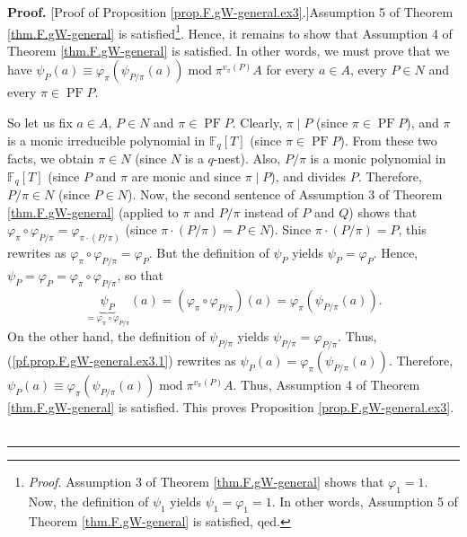 \documentclass[numbers=enddot,12pt,final,onecolumn,notitlepage]{scrartcl}%
\theoremstyle{definition}
\newenvironment{proof}[1][Proof]{\noindent\textbf{#1.} }{\ \rule{0.5em}{0.5em}}
\begin{document}
\begin{proof}
[Proof of Proposition \ref{prop.F.gW-general.ex3}.]Assumption 5 of Theorem
\ref{thm.F.gW-general} is satisfied\footnote{\textit{Proof.} Assumption 3 of
Theorem \ref{thm.F.gW-general} shows that $\varphi_{1}=1$. Now, the definition
of $\psi_{1}$ yields $\psi_{1}=\varphi_{1}=1$. In other words, Assumption 5 of
Theorem \ref{thm.F.gW-general} is satisfied, qed.}. Hence, it remains to show
that Assumption 4 of Theorem \ref{thm.F.gW-general} is satisfied. In other
words, we must prove that we have $\psi_{P}\left(  a\right)  \equiv
\varphi_{\pi}\left(  \psi_{P/\pi}\left(  a\right)  \right)  \operatorname{mod}%
\pi^{v_{\pi}\left(  P\right)  }A$ for every $a\in A$, every $P\in N$ and every
$\pi\in\operatorname*{PF}P$.

So let us fix $a\in A$, $P\in N$ and $\pi\in\operatorname*{PF}P$. Clearly,
$\pi\mid P$ (since $\pi\in\operatorname*{PF}P$), and $\pi$ is a monic
irreducible polynomial in $\mathbb{F}_{q}\left[  T\right]  $ (since $\pi
\in\operatorname*{PF}P$). From these two facts, we obtain $\pi\in N$ (since
$N$ is a $q$-nest). Also, $P/\pi$ is a monic polynomial in $\mathbb{F}%
_{q}\left[  T\right]  $ (since $P$ and $\pi$ are monic and since $\pi\mid P$),
and divides $P$. Therefore, $P/\pi\in N$ (since $P\in N$). Now, the second
sentence of Assumption 3 of Theorem \ref{thm.F.gW-general} (applied to $\pi$
and $P/\pi$ instead of $P$ and $Q$) shows that $\varphi_{\pi}\circ
\varphi_{P/\pi}=\varphi_{\pi\cdot\left(  P/\pi\right)  }$ (since $\pi
\cdot\left(  P/\pi\right)  =P\in N$). Since $\pi\cdot\left(  P/\pi\right)
=P$, this rewrites as $\varphi_{\pi}\circ\varphi_{P/\pi}=\varphi_{P}$. But the
definition of $\psi_{P}$ yields $\psi_{P}=\varphi_{P}$. Hence, $\psi
_{P}=\varphi_{P}=\varphi_{\pi}\circ\varphi_{P/\pi}$, so that%
\begin{equation}
\underbrace{\psi_{P}}_{=\varphi_{\pi}\circ\varphi_{P/\pi}}\left(  a\right)
=\left(  \varphi_{\pi}\circ\varphi_{P/\pi}\right)  \left(  a\right)
=\varphi_{\pi}\left(  \psi_{P/\pi}\left(  a\right)  \right)  .
\label{pf.prop.F.gW-general.ex3.1}%
\end{equation}
On the other hand, the definition of $\psi_{P/\pi}$ yields $\psi_{P/\pi
}=\varphi_{P/\pi}$. Thus, (\ref{pf.prop.F.gW-general.ex3.1}) rewrites as
$\psi_{P}\left(  a\right)  =\varphi_{\pi}\left(  \psi_{P/\pi}\left(  a\right)
\right)  $. Therefore, $\psi_{P}\left(  a\right)  \equiv\varphi_{\pi}\left(
\psi_{P/\pi}\left(  a\right)  \right)  \operatorname{mod}\pi^{v_{\pi}\left(
P\right)  }A$. Thus, Assumption 4 of Theorem \ref{thm.F.gW-general} is
satisfied. This proves Proposition \ref{prop.F.gW-general.ex3}.
\end{proof}
\end{document}
